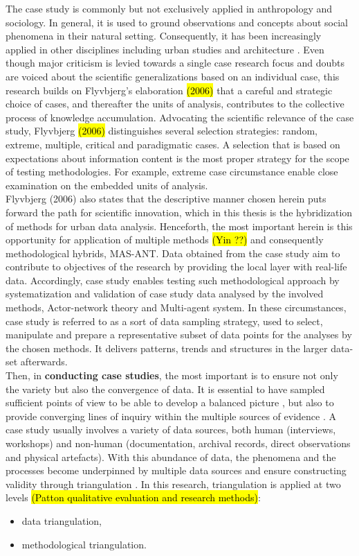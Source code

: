 \documentclass[11pt]{report}
\begin{document}
The case study is commonly but not exclusively applied in anthropology and sociology.
In general, it is used to ground observations and concepts about social phenomena in their natural setting. Consequently, it has been increasingly applied in other disciplines including urban studies and architecture \cite{(Feagin et al. 1991)}. Even though major criticism is levied towards a single case research focus and doubts are voiced about the scientific generalizations based on an individual case, this research builds on Flyvbjerg's elaboration \hl{(2006)} that a careful and strategic choice of cases, and thereafter the units of analysis, contributes to the collective process of knowledge accumulation.
Advocating the scientific relevance of the case study, Flyvbjerg \hl{(2006)} distinguishes several selection strategies: random, extreme, multiple, critical and paradigmatic cases. A selection that is based on expectations about information content is the most proper strategy for the scope of testing methodologies. For example, extreme case circumstance enable close examination on the embedded units of analysis.
\\
Flyvbjerg (2006) also states that the descriptive manner chosen herein puts forward the path for scientific innovation, which in this thesis is the hybridization of methods for urban data analysis. Henceforth, the most important herein is this opportunity for application of multiple methods \hl{(Yin ??)} and consequently methodological hybrids, MAS-ANT. Data obtained from the case study aim to contribute to objectives of the research by providing the local layer with real-life data.
Accordingly, case study enables testing such methodological approach by systematization and validation of case study data analysed by the involved methods, Actor-network theory and Multi-agent system.
In these circumstances, case study is referred to as a sort of data sampling strategy, used to select, manipulate and prepare a representative subset of data points for the analyses by the chosen methods. It delivers patterns, trends and structures in the larger data-set afterwards.
\\
Then, in \textbf{conducting case studies}, the most important is to ensure not only the variety but also the convergence of data. It is essential to have sampled  sufficient  points  of  view  to be able to develop a balanced picture \cite{(Harrison 2002)}, but also to provide converging lines of inquiry within the multiple sources of evidence \cite{(Yin 2009)}.
A case study usually involves a variety of data sources, both human (interviews, workshops) and non-human (documentation, archival records, direct observations and physical artefacts).
With this abundance of data, the phenomena and the processes become underpinned by multiple data sources and ensure constructing validity through triangulation \cite{(Denzin 1987b}. In this research, triangulation is applied at two levels \hl{(Patton qualitative evaluation and research methods)}:
\begin{itemize}
\item data triangulation,
\item methodological triangulation. 
\end{itemize}
\end{document}
